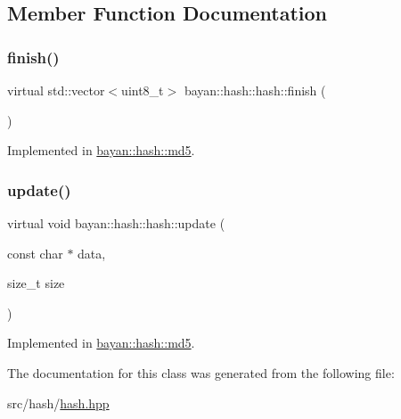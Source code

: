 \subsection{Member Function Documentation}
\mbox{\label{classbayan_1_1hash_1_1hash_a0532214ff924522ba61fbe9a6ade4705}} 
\subsubsection{\texorpdfstring{finish()}{finish()}}
{\footnotesize\ttfamily virtual std\+::vector$<$uint8\+\_\+t$>$ bayan\+::hash\+::hash\+::finish (\begin{DoxyParamCaption}{ }\end{DoxyParamCaption})\hspace{0.3cm}{\ttfamily [pure virtual]}}



Implemented in \hyperlink{classbayan_1_1hash_1_1md5_ade79012c138da38c8b08555dd48f637d}{bayan\+::hash\+::md5}.

\mbox{\label{classbayan_1_1hash_1_1hash_abc43a44f53acc0278f46a96438dc4cf3}} 
\subsubsection{\texorpdfstring{update()}{update()}}
{\footnotesize\ttfamily virtual void bayan\+::hash\+::hash\+::update (\begin{DoxyParamCaption}\item[{const char $\ast$}]{data,  }\item[{size\+\_\+t}]{size }\end{DoxyParamCaption})\hspace{0.3cm}{\ttfamily [pure virtual]}}



Implemented in \hyperlink{classbayan_1_1hash_1_1md5_abfa472bb4db577181800004c0996236f}{bayan\+::hash\+::md5}.



The documentation for this class was generated from the following file\+:\begin{DoxyCompactItemize}
\item 
src/hash/\hyperlink{hash_8hpp}{hash.\+hpp}\end{DoxyCompactItemize}
